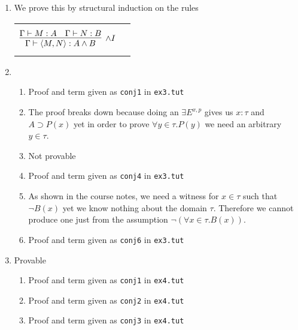 \documentclass{article}
\begin{document}
\begin{enumerate}[label=\textbf{Exercise \arabic*}]
\item We prove this by structural induction on the rules

\begin{tabular}{cc}
$$
\infer[\land I]
  {\Gamma \vdash \langle M,N \rangle : A\land B}
  {\Gamma \vdash M:A & \Gamma \vdash N:B}
$$
&$$
$$
\end{tabular}

\item

\begin{enumerate}[label=\arabic*.,leftmargin=1em]
\item Proof and term given as \texttt{conj1} in \texttt{ex3.tut}
\item The proof breaks down because doing an $\exists E^{x,p}$ gives us $x:\tau$ and $A\supset P(x)$ yet in order to prove $\forall y\in\tau.P(y)$ we need an arbitrary $y\in\tau$.
\item Not provable
\item Proof and term given as \texttt{conj4} in \texttt{ex3.tut}
\item As shown in the course notes, we need a witness for $x\in\tau$ such that $\neg B(x)$ yet we know nothing about the domain $\tau$. Therefore we cannot produce one just from the assumption $\neg(\forall x\in\tau.B(x))$.
\item Proof and term given as \texttt{conj6} in \texttt{ex3.tut}
\end{enumerate}

\item Provable
\begin{enumerate}[label=\arabic*.,leftmargin=1em]
\item Proof and term given as \texttt{conj1} in \texttt{ex4.tut}
\item Proof and term given as \texttt{conj2} in \texttt{ex4.tut}
\item Proof and term given as \texttt{conj3} in \texttt{ex4.tut}
\end{enumerate}

\end{enumerate}
\end{document}

